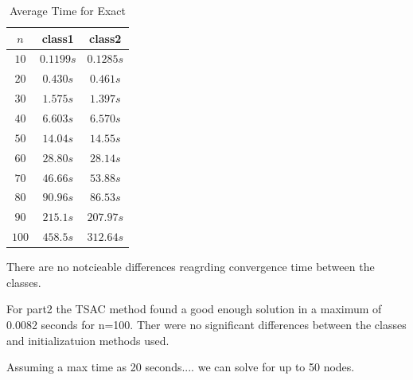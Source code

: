 \documentclass[a4paper, 11pt]{article}
\begin{document}
	
		
		\begin{table}[H]
			\centering
			\begin{tabular}{c|c|c}
				\textbf{$ n $} 	& \textbf{class1} 	& \textbf{class2}  \\ \hline
				$ 10  $			& $ 0.1199 s $ 		& $ 0.1285 s $ \\ \hline
				$ 20  $			& $ 0.430 s $ 		& $ 0.461 s $ \\ \hline
				$ 30  $			& $ 1.575 s $	 	& $ 1.397 s $ \\ \hline
				$ 40  $			& $ 6.603 s $ 		& $ 6.570 s $ \\ \hline
				$ 50  $			& $ 14.04 s $ 		& $ 14.55 s $ \\ \hline
				$ 60 $			& $ 28.80 s $ 		& $ 28.14 s $ \\ \hline
				$ 70 $			& $ 46.66s $	 	& $ 53.88 s $ \\ \hline
				$ 80 $			& $ 90.96 s $ 		& $ 86.53 s $ \\ \hline
				$ 90 $			& $ 215.1 s $	 	& $ 207.97 s $ \\ \hline
				$ 100 $			& $ 458.5 s $ 		& $ 312.64 s $ \\ 
			\end{tabular}
			\caption{Average Time for Exact}
			\label{table:times}
		\end{table}
		There are no notcieable differences reagrding convergence time between the classes.
		
		
		For part2 the TSAC method found a good enough solution in a maximum of 0.0082 seconds for n=100.
		Ther were no significant differences between the classes and initializatuion methods used.
	
		
		Assuming a max time as 20 seconds.... we can solve for up to 50 nodes.
		
\end{document}
